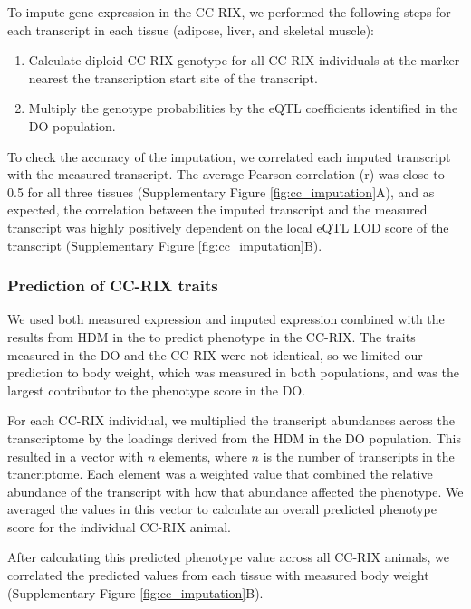 \documentclass[
]{article}
\providecommand{\tightlist}{%
  \setlength{\itemsep}{0pt}\setlength{\parskip}{0pt}}
\begin{document}
To impute gene expression in the CC-RIX, we performed the following
steps for each transcript in each tissue (adipose, liver, and skeletal
muscle):

\begin{enumerate}
\def\labelenumi{\arabic{enumi}.}
\tightlist
\item
  Calculate diploid CC-RIX genotype for all CC-RIX individuals at the
  marker nearest the transcription start site of the transcript.
\item
  Multiply the genotype probabilities by the eQTL coefficients
  identified in the DO population.
\end{enumerate}

To check the accuracy of the imputation, we correlated each imputed
transcript with the measured transcript. The average Pearson correlation
(r) was close to 0.5 for all three tissues (Supplementary Figure
\ref{fig:cc_imputation}A), and as expected, the correlation between the
imputed transcript and the measured transcript was highly positively
dependent on the local eQTL LOD score of the transcript (Supplementary
Figure \ref{fig:cc_imputation}B).

\subsubsection{Prediction of CC-RIX
traits}\label{prediction-of-cc-rix-traits}

We used both measured expression and imputed expression combined with
the results from HDM in the to predict phenotype in the CC-RIX. The
traits measured in the DO and the CC-RIX were not identical, so we
limited our prediction to body weight, which was measured in both
populations, and was the largest contributor to the phenotype score in
the DO.

For each CC-RIX individual, we multiplied the transcript abundances
across the transcriptome by the loadings derived from the HDM in the DO
population. This resulted in a vector with \(n\) elements, where \(n\)
is the number of transcripts in the trancriptome. Each element was a
weighted value that combined the relative abundance of the transcript
with how that abundance affected the phenotype. We averaged the values
in this vector to calculate an overall predicted phenotype score for the
individual CC-RIX animal.

After calculating this predicted phenotype value across all CC-RIX
animals, we correlated the predicted values from each tissue with
measured body weight (Supplementary Figure \ref{fig:cc_imputation}B).
\end{document}
